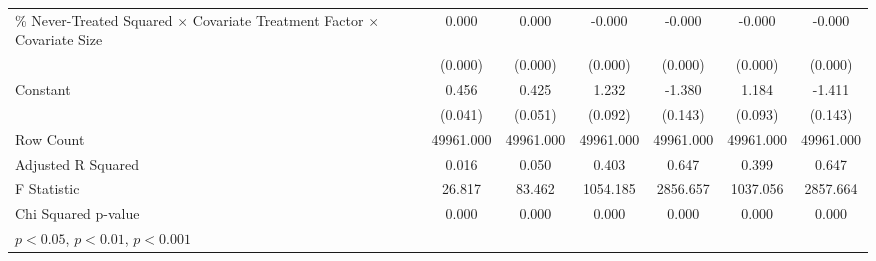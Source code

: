 \begin{table}[htbp]
\begin{tabular}{l*{6}{c}}
\% Never-Treated Squared $\times$ Covariate Treatment Factor $\times$ Covariate Size&       0.000\sym{***}&       0.000\sym{**} &      -0.000         &      -0.000\sym{*}  &      -0.000         &      -0.000\sym{**} \\
                    &     (0.000)         &     (0.000)         &     (0.000)         &     (0.000)         &     (0.000)         &     (0.000)         \\
Constant            &       0.456\sym{***}&       0.425\sym{***}&       1.232\sym{***}&      -1.380\sym{***}&       1.184\sym{***}&      -1.411\sym{***}\\
                    &     (0.041)         &     (0.051)         &     (0.092)         &     (0.143)         &     (0.093)         &     (0.143)         \\
\hline
Row Count           &   49961.000         &   49961.000         &   49961.000         &   49961.000         &   49961.000         &   49961.000         \\
Adjusted R Squared  &       0.016         &       0.050         &       0.403         &       0.647         &       0.399         &       0.647         \\
F Statistic         &      26.817         &      83.462         &    1054.185         &    2856.657         &    1037.056         &    2857.664         \\
Chi Squared p-value &       0.000         &       0.000         &       0.000         &       0.000         &       0.000         &       0.000         \\
\hline\hline
\multicolumn{7}{l}{\footnotesize \sym{*} \(p<0.05\), \sym{**} \(p<0.01\), \sym{***} \(p<0.001\)}\\
\end{tabular}
\end{table}
